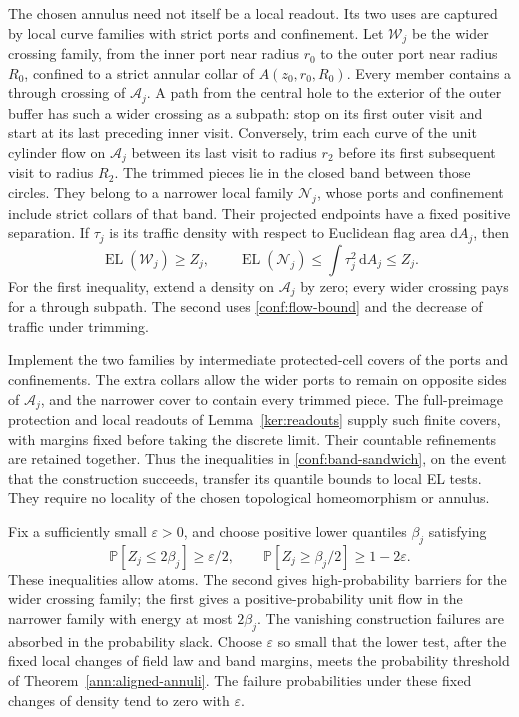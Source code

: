 \documentclass[11pt]{article}
\numberwithin{equation}{section}
\theoremstyle{definition}
\theoremstyle{remark}
\newcommand{\1}{\mathbf 1}
\begin{document}
The chosen annulus need not itself be a local readout.  Its two uses
are captured by local curve families with strict ports and confinement.
Let \(\mathcal W_j\) be the wider crossing family, from the inner
port near radius \(r_0\) to the outer port near radius \(R_0\),
confined to a strict annular collar of \(A(z_0,r_0,R_0)\).
Every member contains a through crossing of \(\mathcal A_j\).
A path from the central hole to the exterior of the outer buffer
has such a wider crossing as a subpath: stop on its first outer
visit and start at its last preceding inner visit.  Conversely, trim each curve
of the unit cylinder flow on \(\mathcal A_j\) between its last visit
to radius \(r_2\) before its first subsequent visit to radius \(R_2\).
The trimmed pieces lie in the closed band between those circles.
They belong to a narrower local family \(\mathcal N_j\), whose
ports and confinement include strict collars of that band.  Their
projected endpoints have a fixed positive separation.  If \(\tau_j\)
is its traffic density with respect to Euclidean flag area
\(\mathrm d A_j\), then
\begin{equation}
 \operatorname{EL}(\mathcal W_j)\ge Z_j,
 \qquad
 \operatorname{EL}(\mathcal N_j)\le\int\tau_j^2\,\mathrm d A_j\le Z_j.
 \label{conf:band-sandwich}
\end{equation}
For the first inequality, extend a density on \(\mathcal A_j\) by
zero; every wider crossing pays for a through subpath.  The second
uses \eqref{conf:flow-bound} and the decrease of traffic under trimming.

Implement the two families by intermediate protected-cell covers of
the ports and confinements.  The extra collars allow the wider ports
to remain on opposite sides of \(\mathcal A_j\), and the narrower
cover to contain every trimmed piece.  The full-preimage protection
and local readouts of Lemma~\ref{ker:readouts} supply such finite
covers, with margins fixed before taking the discrete limit.  Their
countable refinements are retained together.  Thus the inequalities
in \eqref{conf:band-sandwich}, on the event that the construction
succeeds, transfer its quantile bounds to local EL tests.  They require
no locality of the chosen topological homeomorphism or annulus.

Fix a sufficiently small \(\varepsilon>0\), and choose positive
lower quantiles \(\beta_j\) satisfying
\begin{equation}
 \mathbb P[Z_j\le2\beta_j]\ge\varepsilon/2,
 \qquad
 \mathbb P[Z_j\ge\beta_j/2]\ge1-2\varepsilon.
 \label{conf:quantiles}
\end{equation}
These inequalities allow atoms.  The second gives high-probability
barriers for the wider crossing family; the first gives a
positive-probability unit flow in the narrower family with energy
at most \(2\beta_j\).  The vanishing construction failures are
absorbed in the probability slack.  Choose \(\varepsilon\) so small
that the lower test, after the fixed local changes of field law and
band margins, meets the probability threshold of
Theorem~\ref{ann:aligned-annuli}.  The failure probabilities under
these fixed changes of density tend to zero with \(\varepsilon\).
\end{document}
